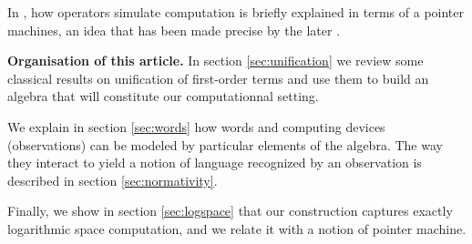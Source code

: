 In \cite{girard_normativity_2012}, how operators simulate computation is briefly explained in terms of a pointer machines, an idea that has been made precise by the later \cite{aubert_characterizing_2012,seiller_logarithmic_2013}.



\smallskip\noindent
\textbf{Organisation of this article.} In section \ref{sec:unification} we review some classical results on unification of first-order terms and use them to build an algebra that will constitute our computationnal setting.

We explain in section \ref{sec:words} how words and computing devices (observations) can be modeled by particular elements of the algebra. The way they interact to yield a notion of language recognized by an observation is described in section \ref{sec:normativity}.

Finally, we show in section \ref{sec:logspace} that our construction captures exactly logarithmic space computation, and we relate it with a notion of pointer machine.
